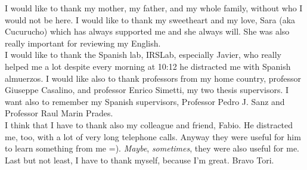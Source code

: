 

\begin{acknowledgements}

I would like to thank my mother, my father, and my whole family, without who I would not be here. I would like to thank my sweetheart and my love, Sara (aka Cucurucho) which has always supported me and she always will. She was also really important for reviewing my English.\\
I would like to thank the Spanish lab, IRSLab, especially Javier, who really helped me a lot despite every morning at 10:12 he distracted me with Spanish almuerzos. I would like also to thank professors from my home country, professor Giuseppe Casalino, and professor Enrico Simetti, my two thesis supervisors. I want also to remember my Spanish supervisors, Professor Pedro J. Sanz and Professor Raul Marin Prades.\\
I think that I have to thank also my colleague and friend, Fabio. He distracted me, too, with a lot of very long telephone calls. Anyway they were useful for him to learn something from me =). \textit{Maybe}, \textit{sometimes}, they were also useful for me.\\
Last but not least, I have to thank myself, because I'm great. Bravo Tori.


\end{acknowledgements}
